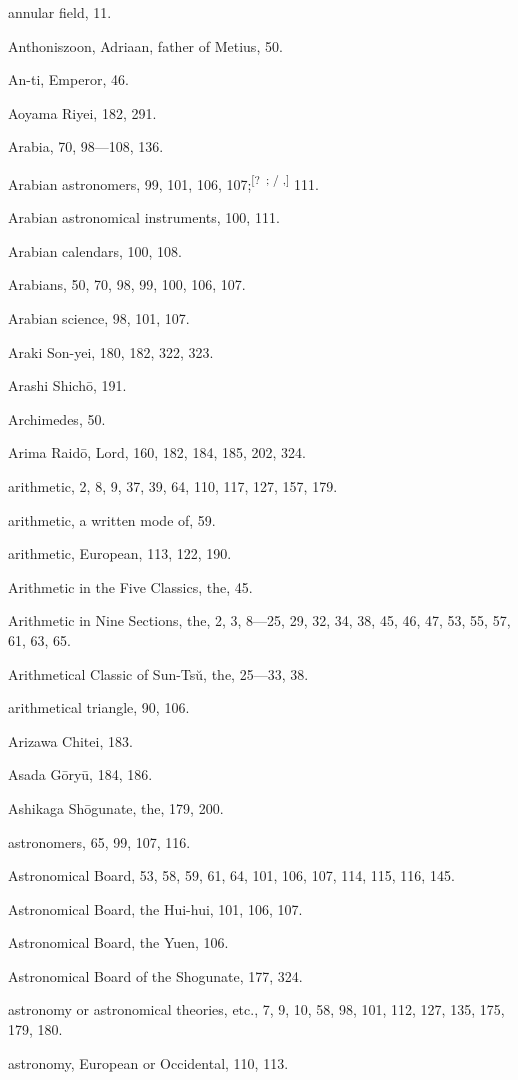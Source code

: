\documentclass[11pt]{article}
\newcommand{\unclear}[1]{\textsuperscript{[?~#1]}}
\begin{document}
annular field, 11.\par
Anthoniszoon, Adriaan, father of Metius, 50.\par
An-ti, Emperor, 46.\par
Aoyama Riyei, 182, 291.\par
Arabia, 70, 98---108, 136.\par
Arabian astronomers, 99, 101, 106, 107;\unclear{; / ,} 111.\par
Arabian astronomical instruments, 100, 111.\par
Arabian calendars, 100, 108.\par
Arabians, 50, 70, 98, 99, 100, 106, 107.\par
Arabian science, 98, 101, 107.\par
Araki Son-yei, 180, 182, 322, 323.\par
Arashi Shichō, 191.\par
Archimedes, 50.\par
Arima Raidō, Lord, 160, 182, 184, 185, 202, 324.\par
arithmetic, 2, 8, 9, 37, 39, 64, 110, 117, 127, 157, 179.\par
arithmetic, a written mode of, 59.\par
arithmetic, European, 113, 122, 190.\par
Arithmetic in the Five Classics, the, 45.\par
Arithmetic in Nine Sections, the, 2, 3, 8---25, 29, 32, 34, 38, 45, 46, 47, 53, 55, 57, 61, 63, 65.\par
Arithmetical Classic of Sun-Tsŭ, the, 25---33, 38.\par
arithmetical triangle, 90, 106.\par
Arizawa Chitei, 183.\par
Asada Gōryū, 184, 186.\par
Ashikaga Shōgunate, the, 179, 200.\par
astronomers, 65, 99, 107, 116.\par
Astronomical Board, 53, 58, 59, 61, 64, 101, 106, 107, 114, 115, 116, 145.\par
Astronomical Board, the Hui-hui, 101, 106, 107.\par
Astronomical Board, the Yuen, 106.\par
Astronomical Board of the Shogunate, 177, 324.\par
astronomy or astronomical theories, etc., 7, 9, 10, 58, 98, 101, 112, 127, 135, 175, 179, 180.\par
astronomy, European or Occidental, 110, 113.\par
\end{document}
